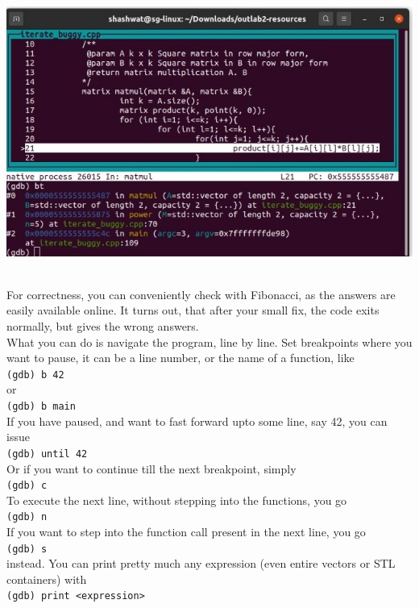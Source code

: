 \documentclass[a4paper,12pt]{article}
\numberwithin{definition}{section}
\numberwithin{mytheorem}{subsection}
\begin{document}
\begin{minipage}{0.3\textwidth}
    \hbox{\hspace{-1.5em}\includegraphics[width=1.5\linewidth, keepaspectratio]{Second Screenshot.jpeg}}  
    \end{minipage} \\   
For correctness, you can conveniently check with Fibonacci, as the answers are easily available
online. It turns out, that after your small fix, the code exits normally, but gives the wrong
answers.\\
What you can do is navigate the program, line by line. Set breakpoints where you want to pause,
it can be a line number, or the name of a function, like\\
\texttt{(gdb) b 42}\\
or\\
\texttt{(gdb) b main}\\
If you have paused, and want to fast forward upto some line, say 42, you can issue\\
\texttt{(gdb) until 42}\\
Or if you want to continue till the next breakpoint, simply\\
\texttt{(gdb) c}\\
To execute the next line, without stepping into the functions, you go\\
\texttt{(gdb) n}\\
If you want to step into the function call present in the next line, you go\\
\texttt{(gdb) s}\\
instead. You can print pretty much any expression (even entire vectors or STL containers) with\\
\texttt{(gdb) print <expression>}\\
\end{document}
